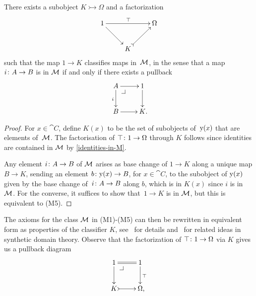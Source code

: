 \documentclass[reqno,10pt,a4paper,oneside,draft]{amsart}
\begin{document}
{{\begin{lemma} \label{partial-map-classifier}
There exists a subobject $K \rightarrowtail \Omega$ and a factorization
\[
\xymatrix{
  1
  \ar[rr]^\top
  \ar[dr]
&&
  \Omega
\\
&
  K
  \ar@{>->}[ur]
}
\]
such that the map $1 \to K$ classifies maps in~$\cal{M}$, in the sense that a map
$i \co A \to B$ is in $\cal{M}$ if and only if there exists a pullback
\[
\xymatrix{
  A
  \ar[r]
  \ar[d]_i
  \drpullback
&
  1
  \ar[d]
\\
  B
  \ar[r]
&
  K
\rlap{.}}
\]
\end{lemma}

\begin{proof}
For $x \in \cat{C}$, define $K(x)$ to be the set of subobjects of~$\yon(x)$ that are elements of~$\cal{M}$.
The factorisation of $\top \co 1 \to \Omega$ through $K$ follows since identities are contained in $\cal{M}$ by \cref{identities-in-M}.

Any element $i \co A \to B$ of $\cal{M}$ arises as base change of $1 \to K$ along a unique map $B \to K$, sending an element $b \co \yon(x) \to B$, for $x \in \cat{C}$, to the subobject of $\yon(x)$ given by the base change of~$i \co A  \to B$ along $b$, which is in $K(x)$ since $i$ is in $\cal{M}$.
For the converse, it suffices to show that~$1 \to K$ is in $\cal{M}$, but this is equivalent to (M5).
\end{proof}

The axioms for the class $\cal{M}$ in (M1)-(M5) can then be rewritten in equivalent form as properties of the classifier $K$, see~\cite{PittsAM:aximct} for details and~\cite{HylandM:firssd,RosoliniG:phd} for related ideas in synthetic domain
theory.
Observe that the factorization of $\top \co 1 \to \Omega$ via $K$ gives us a pullback diagram
\begin{equation} \label{partial-map-classifier:0}
\begin{gathered}
\xymatrix{
  1
  \ar@{=}[r]
  \ar[d]
  \pullback{dr}
&
  1
  \ar[d]^{\top}
\\
  K
  \ar@{>->}[r]
&
  \Omega \rlap{,}
}
\end{gathered}
\end{equation}

}}
\end{document}
